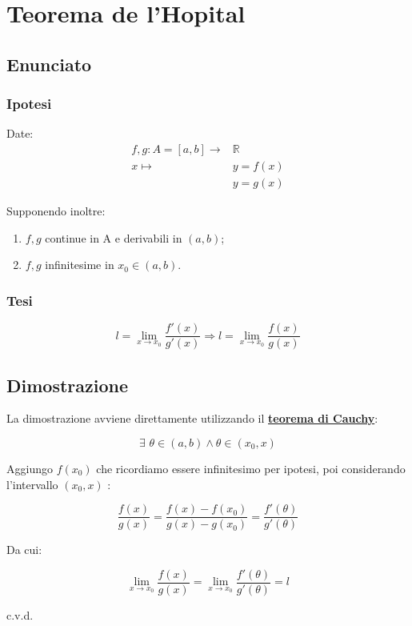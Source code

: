 \documentclass[../dimostrazioni]{subfiles}
\begin{document}
    \chapter{Teorema de l'Hopital}
    \label{teoHopital}

        \section*{Enunciato}

            \subsection*{Ipotesi}

                Date:
                \begin{align*}
                    f,g : A = [a, b] \longrightarrow &\mathbb{R}\\
                    x \longmapsto &y = f(x)\\
                                  &y = g(x) 
                \end{align*}

                Supponendo inoltre: 

                \begin{enumerate}
                    \indentitem \item \(f, g\) continue in A e derivabili in \( (a,b) \);
                    \indentitem \item \(f, g\) infinitesime in \(x_0 \in (a,b)\).
                \end{enumerate}

            \subsection*{Tesi}

                \[ 
                    l = \lim_{x \to x_0} \frac{f'(x)}{g'(x)} \Rightarrow l = \lim_{x \to x_0} \frac{f(x)}{g(x)}
                \]

        \section*{Dimostrazione}

            La dimostrazione avviene direttamente utilizzando il \textbf{\hyperref[teoCauchy]{teorema di Cauchy}}:

            \[ \exists \, \, \theta \in (a,b) \land \theta \in (x_0, x) \]

            Aggiungo \(f(x_0)\) che ricordiamo essere infinitesimo per ipotesi, poi considerando l'intervallo \((x_0, x)\) :

            \[  \frac{f(x)}{g(x)} = \frac{f(x) - f(x_0)}{g(x) - g(x_0)} = \frac{f'(\theta)}{g'(\theta)} \]

            Da cui:
            
            \[  \lim_{x \to x_0} \frac{f(x)}{g(x)} = \lim_{x \to x_0} \frac{f'(\theta)}{g'(\theta)} = l \]
            
            c.v.d.
\end{document}
